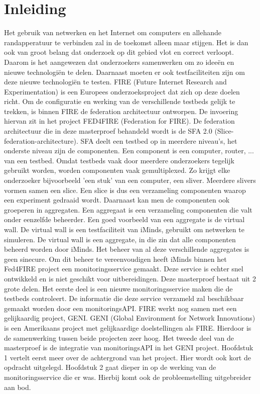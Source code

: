 \chapter{Inleiding}
\npar
Het gebruik van netwerken en het Internet om computers en allehande randapperatuur te verbinden zal in de toekomst alleen maar stijgen. Het is dan ook van groot belang dat onderzoek op dit gebied vlot en correct verloopt. Daarom is het aangewezen dat onderzoekers samenwerken om zo ideeën en nieuwe technologiën te delen. Daarnaast moeten er ook testfaciliteiten zijn om deze nieuwe technologiën te testen.
FIRE (Future Internet Research and Experimentation) is een Europees onderzoeksproject dat zich op deze doelen richt.
\npar
Om de configuratie en werking van de verschillende testbeds gelijk te trekken, is binnen FIRE de federation architectuur ontworpen. De invoering hiervan zit in het project FED4FIRE (Federation for FIRE). De federation architectuur die in deze masterproef behandeld wordt is de SFA 2.0 (Slice-federation-architecture). SFA deelt een testbed op in meerdere niveau's, het onderste niveau zijn de componenten. Een component is een computer, router, ... van een testbed. Omdat testbeds vaak door meerdere onderzoekers tegelijk gebruikt worden, worden componenten vaak gemultiplexed. Zo krijgt elke onderzoeker bijvoorbeeld 'een stuk' van een computer, een sliver. Meerdere slivers vormen samen een slice. Een slice is dus een verzameling componenten waarop een experiment gedraaid wordt. Daarnaast kan men de componenten ook groeperen in aggregaten. Een aggregaat is een verzameling componenten die valt onder eenzelfde beheerder. Een goed voorbeeld van een aggregate is de virtual wall. De virtual wall is een testfaciliteit van iMinds, gebruikt om netwerken te simuleren. De virtual wall is een aggregate, in die zin dat alle componenten beheerd worden door iMinds.
\npar
Het beheer van al deze verschillende aggregates is geen sinecure. Om dit beheer te vereenvoudigen heeft iMinds binnen het Fed4FIRE project een monitoringsservice gemaakt. Deze service is echter snel ontwikkeld en is niet geschikt voor uitbereidingen. Deze masterproef bestaat uit 2 grote delen. Het eerste deel is een nieuwe monitoringsservice maken die de testbeds controleert. De informatie die deze service verzameld zal beschikbaar gemaakt worden door een monitoringsAPI. 
\npar
FIRE werkt nog samen met een gelijkaardig project, GENI. GENI (Global Environment for Network Innovations) is een Amerikaans project met gelijkaardige doelstellingen als FIRE. Hierdoor is de samenwerking tussen beide projecten zeer hoog. Het tweede deel van de masterproef is de integratie van monitoringsAPI in het GENI project.
\npar
Hoofdstuk 1 vertelt eerst meer over de achtergrond van het project. Hier wordt ook kort de opdracht uitgelegd.
\npar
Hoofdstuk 2 gaat dieper in op de werking van de monitoringsservice die er was. Hierbij komt ook de probleemstelling uitgebreider aan bod.